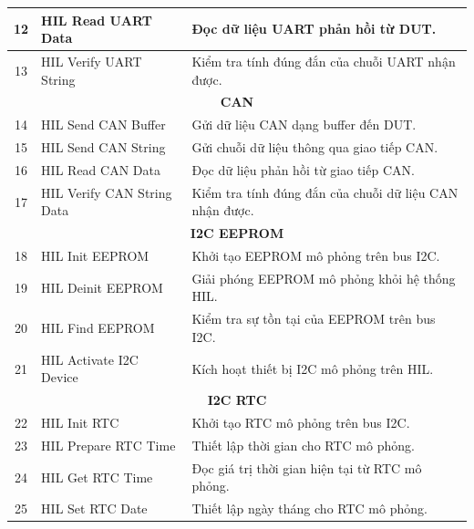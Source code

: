 \begin{longtable}{|c|p{4.8cm}|p{7.8cm}|}
12 & HIL Read UART Data
& Đọc dữ liệu UART phản hồi từ DUT. \\
\hline

13 & HIL Verify UART String
& Kiểm tra tính đúng đắn của chuỗi UART nhận được. \\
\hline

\multicolumn{3}{|c|}{\textbf{CAN}} \\
\hline

14 & HIL Send CAN Buffer
& Gửi dữ liệu CAN dạng buffer đến DUT. \\
\hline

15 & HIL Send CAN String
& Gửi chuỗi dữ liệu thông qua giao tiếp CAN. \\
\hline

16 & HIL Read CAN Data
& Đọc dữ liệu phản hồi từ giao tiếp CAN. \\
\hline

17 & HIL Verify CAN String Data
& Kiểm tra tính đúng đắn của chuỗi dữ liệu CAN nhận được. \\
\hline

\multicolumn{3}{|c|}{\textbf{I2C EEPROM}} \\
\hline

18 & HIL Init EEPROM
& Khởi tạo EEPROM mô phỏng trên bus I2C. \\
\hline

19 & HIL Deinit EEPROM
& Giải phóng EEPROM mô phỏng khỏi hệ thống HIL. \\
\hline

20 & HIL Find EEPROM
& Kiểm tra sự tồn tại của EEPROM trên bus I2C. \\
\hline

21 & HIL Activate I2C Device
& Kích hoạt thiết bị I2C mô phỏng trên HIL. \\
\hline

\multicolumn{3}{|c|}{\textbf{I2C RTC}} \\
\hline

22 & HIL Init RTC
& Khởi tạo RTC mô phỏng trên bus I2C. \\
\hline

23 & HIL Prepare RTC Time
& Thiết lập thời gian cho RTC mô phỏng. \\
\hline

24 & HIL Get RTC Time
& Đọc giá trị thời gian hiện tại từ RTC mô phỏng. \\
\hline

25 & HIL Set RTC Date
& Thiết lập ngày tháng cho RTC mô phỏng. \\
\hline


\end{longtable}
